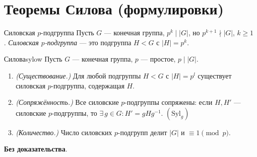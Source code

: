 \section{Теоремы Силова (формулировки)}

\begin{Definition}{Силовская $p$-подгруппа}{}
	Пусть $G$ — конечная группа, $p^k \mid |G|$, но $p^{k+1} \nmid |G|$, $k \geq 1$.
	\textit{Силовская $p$-подгруппа} — это подгруппа $H < G$ с $|H| = p^k$.
\end{Definition}

\begin{Theorem}{Силова}{sylow}
	Пусть $G$ — конечная группа, $p$ — простое, $p \mid |G|$.
	\begin{enumerate}
		\item \textit{(Существование.)} Для любой подгруппы $H < G$ с $|H| = p^l$ существует силовская $p$-подгруппа, содержащая $H$.
		\item \textit{(Сопряжённость.)} Все силовские $p$-подгруппы сопряжены: если $H, H'$ — силовские $p$-подгруппы, то $\exists\, g \in G\colon H' = gHg^{-1}$.
		\quad $(\mathrm{Syl}_g)$ 
		\item \textit{(Количество.)} Число силовских $p$-подгрупп делит $|G|$ и $\equiv 1 \pmod{p}$.
	\end{enumerate}
\end{Theorem}

\textbf{Без доказательства}.

